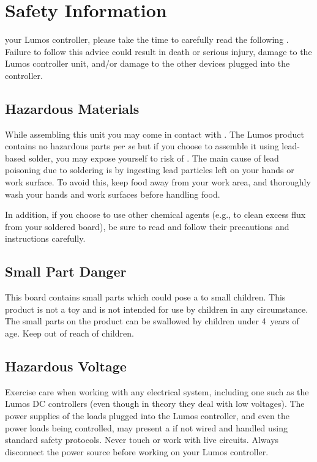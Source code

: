 \chapter{Safety Information}\label{ch:safety}

 your Lumos controller, please take the time to
carefully read the following .  Failure to follow this advice could
result in death or serious injury, damage to the Lumos controller unit, and/or damage
to the other devices plugged into the controller.

\section{Hazardous Materials}
While assembling this unit you may come in contact with .  The Lumos
product contains no hazardous parts \emph{per se} but if you choose to assemble it using
lead-based solder, you may expose yourself to risk of .  The main cause of lead
poisoning due to soldering is by ingesting lead particles left on your hands or work surface.
To avoid this, keep food away from your work area, and thoroughly wash your hands and work
surfaces before handling food.

In addition, if you choose to use other chemical agents (e.g., to clean excess flux from your
soldered board), be sure to read and follow their precautions and instructions carefully.

\section{Small Part Danger}
This board contains small parts which could pose a  to small children.
This product is not a toy and is not intended for use by children in any circumstance.
The small parts on the product can be swallowed by children under 4~years of age. Keep
out of reach of children.

\section{Hazardous Voltage}
Exercise care when working with any electrical system, including one such as the Lumos DC
controllers (even though in theory they deal with low voltages).  The power supplies of the
loads plugged into the Lumos controller, and even the power loads being controlled, may present
a  if not wired and handled using standard safety protocols.  Never touch or work
with live circuits. Always disconnect the power source before working on your Lumos controller.

